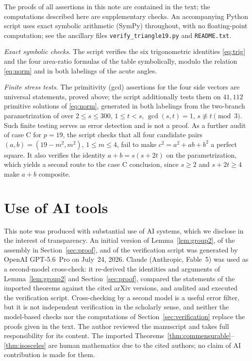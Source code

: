 \documentclass[11pt]{amsart}
\theoremstyle{remark}
\begin{document}
The proofs of all assertions in this note are contained in the text; the computations described here are supplementary checks. An accompanying Python script uses exact symbolic arithmetic (SymPy) throughout, with no floating-point computation; see the ancillary files \texttt{verify\_triangle19.py} and \texttt{README.txt}.

\emph{Exact symbolic checks.} The script verifies the six trigonometric identities \eqref{eq:trig} and the four area-ratio formulas of the table symbolically, modulo the relation \eqref{eq:norm} and in both labelings of the acute angles.

\emph{Finite stress tests.} The primitivity (gcd) assertions for the four side vectors are universal statements, proved above; the script additionally tests them on $41{,}112$ primitive solutions of \eqref{eq:norm}, generated in both labelings from the two-branch parametrization of \cite[Theorem~6]{BeesonPrime} over $2\le s\le 300$, $1\le t<s$, $\gcd(s,t)=1$, $s\not\equiv t\pmod 3$. Such finite testing serves as error detection and is not a proof. As a further audit of case C for $p=19$, the script checks that all four candidate pairs $(a,b)=(19-m^2,m^2)$, $1\le m\le 4$, fail to make $c^2=a^2+ab+b^2$ a perfect square. It also verifies the identity $a+b=s(s+2t)$ on the parametrization, which yields a second route to the case C conclusion, since $s\ge 2$ and $s+2t\ge 4$ make $a+b$ composite.

\section*{Use of AI tools}

This note was produced with substantial use of AI systems, which we disclose in the interest of transparency. An initial version of Lemma~\ref{lem:group2}, of the assembly in Section~\ref{sec:proof}, and of the verification script was generated by OpenAI GPT-5.6~Pro on July~24, 2026. Claude (Anthropic, Fable~5) was used as a second-model cross-check: it re-derived the identities and arguments of Lemma~\ref{lem:group2} and Section~\ref{sec:proof}, compared the statements of the imported theorems against the cited arXiv versions, and audited and executed the verification script. Cross-checking by a second model is a useful error filter, but it is not independent verification in the scholarly sense, and neither the model-based checks nor the computations of Section~\ref{sec:verification} replace the proofs given in the text. The author reviewed the manuscript and takes full responsibility for its content. The imported Theorems~\ref{thm:commensurable}--\ref{thm:isosceles} are human mathematics due to the cited authors; no claim of AI contribution is made for them.
\end{document}
